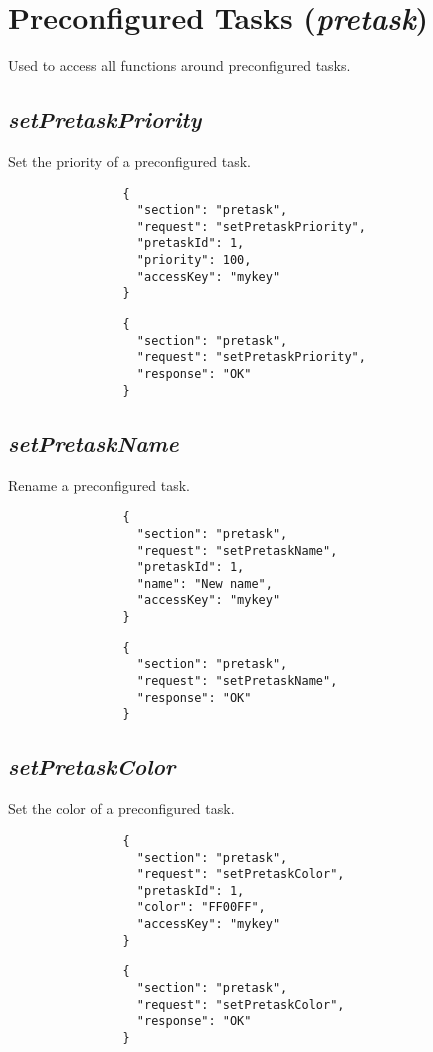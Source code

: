 \section*{Preconfigured Tasks (\textit{pretask})}
		Used to access all functions around preconfigured tasks. 
		\subsection*{\textit{setPretaskPriority}}
			Set the priority of a preconfigured task.
			{
				\color{blue}
				\begin{verbatim}
				{
				  "section": "pretask",
				  "request": "setPretaskPriority",
				  "pretaskId": 1,
				  "priority": 100,
				  "accessKey": "mykey"
				}
				\end{verbatim}
			}
			{
				\color{OliveGreen}
				\begin{verbatim}
				{
				  "section": "pretask",
				  "request": "setPretaskPriority",
				  "response": "OK"
				}
				\end{verbatim}
			}
		\subsection*{\textit{setPretaskName}}
			Rename a preconfigured task.
			{
				\color{blue}
				\begin{verbatim}
				{
				  "section": "pretask",
				  "request": "setPretaskName",
				  "pretaskId": 1,
				  "name": "New name",
				  "accessKey": "mykey"
				}
				\end{verbatim}
			}
			{
				\color{OliveGreen}
				\begin{verbatim}
				{
				  "section": "pretask",
				  "request": "setPretaskName",
				  "response": "OK"
				}
				\end{verbatim}
			}
		\subsection*{\textit{setPretaskColor}}
			Set the color of a preconfigured task.
			{
				\color{blue}
				\begin{verbatim}
				{
				  "section": "pretask",
				  "request": "setPretaskColor",
				  "pretaskId": 1,
				  "color": "FF00FF",
				  "accessKey": "mykey"
				}
				\end{verbatim}
			}
			{
				\color{OliveGreen}
				\begin{verbatim}
				{
				  "section": "pretask",
				  "request": "setPretaskColor",
				  "response": "OK"
				}
				\end{verbatim}
			}
